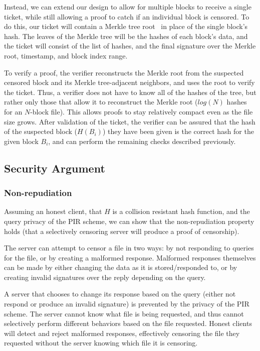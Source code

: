 Instead, we can extend our design to allow for multiple blocks to receive a
single ticket, while still allowing a proof to catch if an individual block is
censored. To do this, our ticket will contain a Merkle tree root~\cite{merkle}
in place of the single block's hash. The leaves of the Merkle tree will be the
hashes of each block's data, and the ticket will consist of the list of hashes,
and the final signature over the Merkle root, timestamp, and block index
range.

To verify a proof, the verifier reconstructs the Merkle root from the
suspected censored block and its Merkle tree-adjacent neighbors, and uses the
root to verify the ticket. Thus, a
verifier does not have to know all of the hashes of the tree, but rather only
those that allow it to reconstruct the Merkle root ($log(N)$ hashes for an
$N$-block file). This allows proofs to stay relatively compact even as the file
size grows. After validation of the ticket, the verifier can be assured that the
hash of the suspected block ($H(B_i)$) they have been given is the correct hash
for the given block $B_i$, and can perform the remaining checks described
previously.

\subsection{Security Argument}

\subsubsection{Non-repudiation}
Assuming an honest client, that $H$ is a collision resistant hash function,
and the query privacy of the PIR scheme, we can show
that the non-repudiation property holds (that a selectively censoring server
will produce a proof of censorship).

The server can attempt to censor a file in two ways: by not responding to
queries for the file, or by creating a malformed response. Malformed responses
themselves can be made by either changing the data as it is stored/responded to,
or by creating invalid signatures over the reply depending on the query.

A server that chooses to change its response based on the query (either not
respond or produce an invalid signature) is prevented by the privacy of the PIR
scheme. The server cannot know what file is being requested, and thus cannot
selectively perform different behaviors based on the file requested. Honest
clients will detect and reject malformed responses, effectively censoring the
file they requested without the server knowing which file it is censoring.

